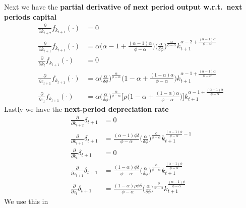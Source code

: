 \documentclass[a4paper]{article}
\theoremstyle{definition}
\begin{document}
Next we have the \textbf{partial derivative of next period output w.r.t.\ next periods capital}
	\begin{align*}
	\frac{\partial}{\partial k_{t+2}}f_{k_{t+1}}(\cdot) 	&= 0 \\
	\frac{\partial}{\partial k_{t+1}}f_{k_{t+1}}(\cdot) 	&= \alpha \Big( \alpha-1+\frac{(\alpha-1)\alpha}{\phi-\alpha} \Big) \Big( \frac{\alpha}{\delta\phi} \Big)^{\frac{\alpha}{\phi-\alpha}} k_{t+1}^{\alpha-2+\frac{(\alpha-1)\alpha}{\phi-\alpha}} \\
	\frac{\partial}{\partial k_{t}}f_{k_{t+1}}(\cdot) 		&= 0 \\
	\frac{\partial}{\partial z_{t+1}}f_{k_{t+1}}(\cdot) 	&= \alpha \Big( \frac{\alpha}{\delta\phi} \Big)^{\frac{\alpha}{\phi-\alpha}} \Big( 1-\alpha+\frac{(1-\alpha)\alpha}{\phi-\alpha} \Big) k_{t+1}^{\alpha-1+\frac{(\alpha-1)\alpha}{\phi-\alpha}} \\
	\frac{\partial}{\partial z_t}f_{k_{t+1}}(\cdot) 			&= \alpha \Big( \frac{\alpha}{\delta\phi} \Big)^{\frac{\alpha}{\phi-\alpha}}\Big[ \rho \Big( {1-\alpha+\frac{(1-\alpha)\alpha}{\phi-\alpha}}\Big) \Big] k_{t+1}^{\alpha-1+\frac{(\alpha-1)\alpha}{\phi-\alpha}}
	\end{align*}	
Lastly we have the \textbf{next-period depreciation rate}
	\begin{align*}
	\frac{\partial}{\partial k_{t+2}}\delta_{t+1} 	&= 0 \\
	\frac{\partial}{\partial k_{t+1}}\delta_{t+1} 	&= \frac{(\alpha-1)\phi\delta}{\phi-\alpha}\Big( \frac{\alpha}{\delta\phi} \Big)^{\frac{\phi}{\phi-\alpha}}k_{t+1}^{\frac{(\alpha-1)\phi}{\phi-\alpha}-1} \\
	\frac{\partial}{\partial k_{t}}\delta_{t+1} 		&=	0 \\
	\frac{\partial}{\partial z_{t+1}}\delta_{t+1} 	&= \frac{(1-\alpha)\phi\delta}{\phi-\alpha} \Big( \frac{\alpha}{\delta\phi} \Big)^{\frac{\phi}{\phi-\alpha}} k_{t+1}^{\frac{(\alpha-1)\phi}{\phi-\alpha}}\\
	\frac{\partial}{\partial z_{t}}\delta_{t+1} 		&= \frac{(1-\alpha)\rho\phi\delta}{\phi-\alpha} \Big( \frac{\alpha}{\delta\phi} \Big)^{\frac{\phi}{\phi-\alpha}} k_{t+1}^{\frac{(\alpha-1)\phi}{\phi-\alpha}}
	\end{align*}
We use this in 
\end{document}
